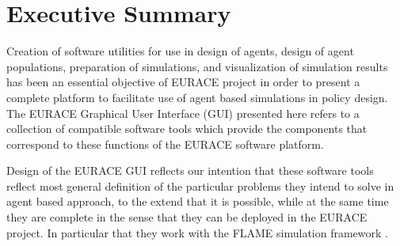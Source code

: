 \documentclass[urop]{socreport}
\begin{document}


\tableofcontents
\listoffigures


\chapter{Executive Summary}
Creation of software utilities for use in design of agents, design of agent populations, preparation of simulations, and visualization of simulation results has been an essential objective of EURACE project in order to present a complete platform to facilitate use of agent based simulations in policy design. The EURACE Graphical User Interface (GUI) presented here refers to a collection of compatible software tools which provide the components that correspond to these functions of the EURACE software platform.

Design of the EURACE GUI reflects our intention that these software tools reflect most general definition of the particular problems they intend to solve in agent based approach, to the extend that it is possible, while at the same time they are complete in the sense that they can be deployed in the EURACE project. In particular that they work with the FLAME simulation framework \citep{HOLCOMBE:2006}.
\end{document}
